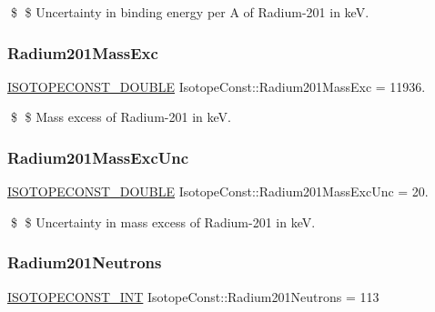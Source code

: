 \$ \$ Uncertainty in binding energy per A of Radium-\/201 in keV. \mbox{\label{group___isotope_const-_radium-_ra201_ga0831d8fd367786e58419b529fef143d1}} 
\subsubsection{\texorpdfstring{Radium201\+Mass\+Exc}{Radium201MassExc}}
{\footnotesize\ttfamily \mbox{\hyperlink{group___isotope_const-_macros_ga8f45a7272ce02c0b4c65c44636ed719a}{I\+S\+O\+T\+O\+P\+E\+C\+O\+N\+S\+T\+\_\+\+D\+O\+U\+B\+LE}} Isotope\+Const\+::\+Radium201\+Mass\+Exc = 11936.}

\$ \$ Mass excess of Radium-\/201 in keV. \mbox{\label{group___isotope_const-_radium-_ra201_ga16e217ab291d84a2ee2912850d0b28b5}} 
\subsubsection{\texorpdfstring{Radium201\+Mass\+Exc\+Unc}{Radium201MassExcUnc}}
{\footnotesize\ttfamily \mbox{\hyperlink{group___isotope_const-_macros_ga8f45a7272ce02c0b4c65c44636ed719a}{I\+S\+O\+T\+O\+P\+E\+C\+O\+N\+S\+T\+\_\+\+D\+O\+U\+B\+LE}} Isotope\+Const\+::\+Radium201\+Mass\+Exc\+Unc = 20.}

\$ \$ Uncertainty in mass excess of Radium-\/201 in keV. \mbox{\label{group___isotope_const-_radium-_ra201_gab5e0bcde5a255efe06cd2a5465e4c760}} 
\subsubsection{\texorpdfstring{Radium201\+Neutrons}{Radium201Neutrons}}
{\footnotesize\ttfamily \mbox{\hyperlink{group___isotope_const-_macros_ga5f18360b3e99483a35c32d789e62621c}{I\+S\+O\+T\+O\+P\+E\+C\+O\+N\+S\+T\+\_\+\+I\+NT}} Isotope\+Const\+::\+Radium201\+Neutrons = 113}

